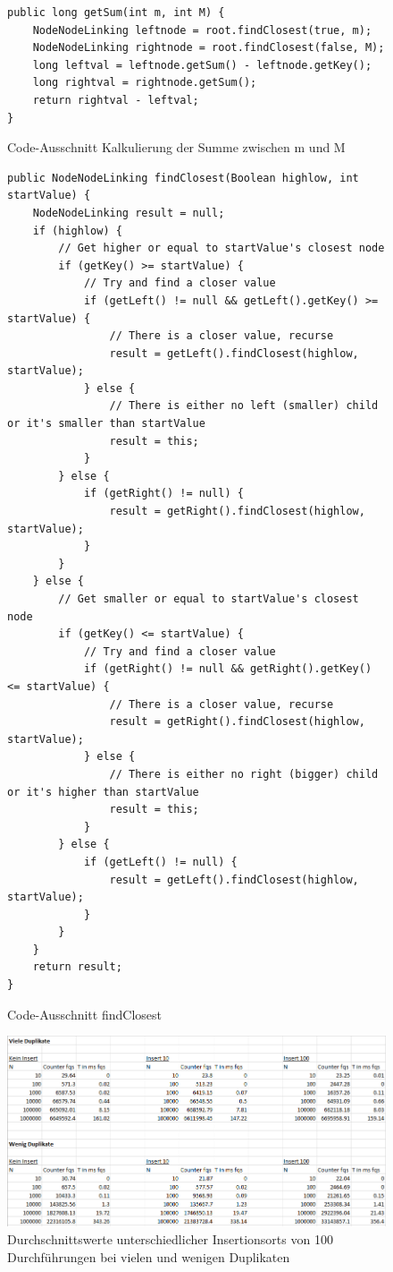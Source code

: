 \documentclass[11pt]{scrartcl}
\begin{document}
\begin{figure}
\begin{verbatim}
public long getSum(int m, int M) {
    NodeNodeLinking leftnode = root.findClosest(true, m);
    NodeNodeLinking rightnode = root.findClosest(false, M);
    long leftval = leftnode.getSum() - leftnode.getKey();
    long rightval = rightnode.getSum();
    return rightval - leftval;
}
\end{verbatim}
\caption{Code-Ausschnitt Kalkulierung der Summe zwischen m und M}
\label{figure:sumCalc}
\end{figure}

\begin{figure}
\begin{verbatim}
public NodeNodeLinking findClosest(Boolean highlow, int startValue) {
    NodeNodeLinking result = null;
    if (highlow) {
        // Get higher or equal to startValue's closest node
        if (getKey() >= startValue) {
            // Try and find a closer value
            if (getLeft() != null && getLeft().getKey() >= startValue) {
                // There is a closer value, recurse
                result = getLeft().findClosest(highlow, startValue);
            } else {
                // There is either no left (smaller) child or it's smaller than startValue
                result = this;
            }
        } else {
            if (getRight() != null) {
                result = getRight().findClosest(highlow, startValue);
            }
        }
    } else {
        // Get smaller or equal to startValue's closest node
        if (getKey() <= startValue) {
            // Try and find a closer value
            if (getRight() != null && getRight().getKey() <= startValue) {
                // There is a closer value, recurse
                result = getRight().findClosest(highlow, startValue);
            } else {
                // There is either no right (bigger) child or it's higher than startValue
                result = this;
            }
        } else {
            if (getLeft() != null) {
                result = getLeft().findClosest(highlow, startValue);
            }
        }
    }
    return result;
}
\end{verbatim}
\caption{Code-Ausschnitt findClosest}
\label{figure:findClosest}
\end{figure}

\begin{figure}
\includegraphics[width=\linewidth]{insertiontable.png}
\caption{Durchschnittswerte unterschiedlicher Insertionsorts von 100 Durchführungen bei vielen und wenigen Duplikaten}
\label{figure:table}
\end{figure}
\end{document}
